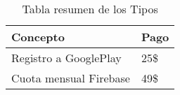 \begin{table}[!ht]
\begin{center}
\begin{tabular}{|p{25mm}|p{80mm}|} \hline 
\textbf{Concepto } & \textbf{Pago} \\ \hline
Registro a GooglePlay &
25\$
\\
\hline

Cuota mensual Firebase &
49\$
\\
\hline

\end{tabular}
\end{center}
\caption{Tabla resumen de los Tipos}
\label{table:resOthers}
\end{table}

